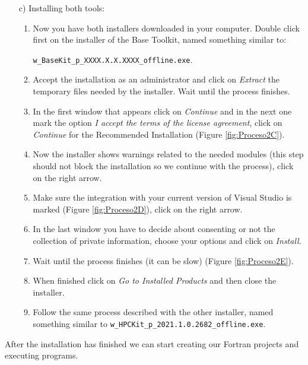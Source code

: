 \begin{itemize}
    \item[c)] Installing both tools:
    \begin{enumerate}
        \item Now you have both installers downloaded in your computer. Double click first on the installer of the Base Toolkit, named something similar to:
        
         \texttt{w\_BaseKit\_p\_XXXX.X.X.XXXX\_offline.exe}.
        \item Accept the installation as an administrator and click on \textit{Extract} the temporary files needed by the installer. Wait until the process finishes. 
        \item In the first window that appears click on \textit{Continue} and in the next one mark the option \textit{I accept the terms of the license agreement}, click on \textit{Continue} for the Recommended Installation (Figure \ref{fig:Proceso2C}). 
        \item Now the installer shows warnings related to the needed modules (this step should not block the installation so we continue with the process), click on the right arrow. 
        \item Make sure the integration with your current version of Visual Studio is marked (Figure \ref{fig:Proceso2D}), click on the right arrow.
        \item In the last window you have to decide about consenting or not the collection of private information, choose your options and click on \textit{Install}.
        \item Wait until the process finishes (it can be slow) (Figure \ref{fig:Proceso2E}). 
        \item When finished click on \textit{Go to Installed Products} and then close the installer. 
        \item Follow the same process described with the other installer, named something similar to \texttt{w\_HPCKit\_p\_2021.1.0.2682\_offline.exe}.
    \end{enumerate}
\end{itemize}

After the installation has finished we can start creating our Fortran projects and executing programs.

